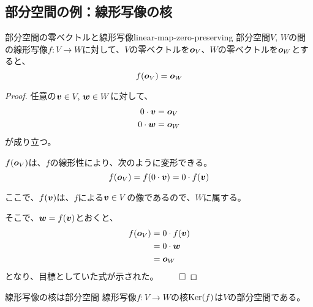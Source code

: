 \documentclass[../../../topic_linear-algebra]{subfiles}
\begin{document}
\subsection{部分空間の例：線形写像の核}

\begin{theorem}{部分空間の零ベクトルと線形写像}{linear-map-zero-preserving}
  部分空間$V,\,W$の間の線形写像$f\colon V \to W$に対して、$V$の零ベクトルを$\vb*{o}_V$、$W$の零ベクトルを$\vb*{o}_W$とすると、
  \begin{equation*}
    f(\vb*{o}_V) = \vb*{o}_W
  \end{equation*}
\end{theorem}

\begin{proof}
  任意の$\vb*{v} \in V,\, \vb*{w} \in W$に対して、
  \begin{align*}
    0  \cdot \vb*{v} & = \vb*{o}_V \\
    0 \cdot \vb*{w}  & = \vb*{o}_W
  \end{align*}
  が成り立つ。

  \br

  $f(\vb*{o}_V)$は、$f$の線形性により、次のように変形できる。
  \begin{equation*}
    f(\vb*{o}_V) = f(0 \cdot \vb*{v}) = 0 \cdot f(\vb*{v})
  \end{equation*}

  ここで、$f(\vb*{v})$は、$f$による$\vb*{v} \in V$の像であるので、$W$に属する。

  そこで、$\vb*{w} = f(\vb*{v})$とおくと、
  \begin{align*}
    f(\vb*{o}_V) & = 0 \cdot f(\vb*{v}) \\
                 & = 0 \cdot \vb*{w}    \\
                 & = \vb*{o}_W
  \end{align*}
  となり、目標としていた式が示された。 $\qed$
\end{proof}

\br

\begin{theorem*}{線形写像の核は部分空間}
  線形写像$f\colon V \to W$の核$\operatorname{Ker}(f)$は$V$の部分空間である。
\end{theorem*}
\end{document}
